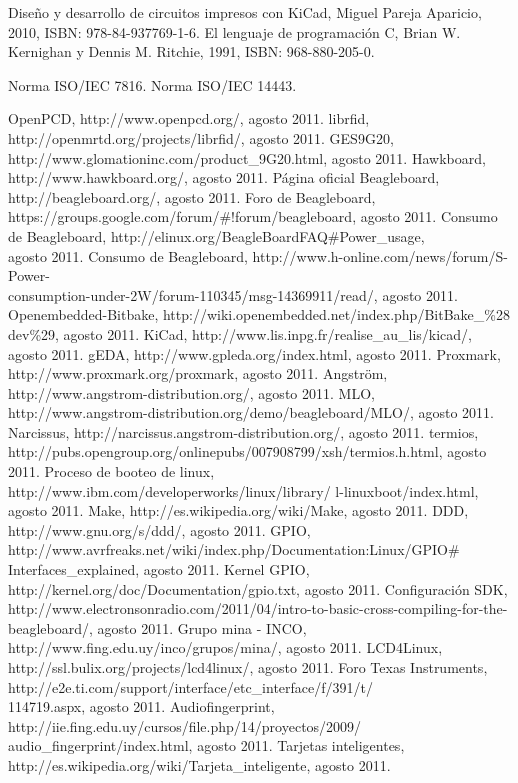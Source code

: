 \begin{thebibliography}{200}
 Diseño y desarrollo de circuitos impresos con KiCad, Miguel Pareja Aparicio, 2010, ISBN: 978-84-937769-1-6.
\bibitem{} El lenguaje de programación C, Brian W. Kernighan y Dennis M. Ritchie, 1991, ISBN: 968-880-205-0.

 Norma ISO/IEC 7816.
 Norma ISO/IEC 14443.


 OpenPCD, http://www.openpcd.org/, agosto 2011.
 librfid, http://openmrtd.org/projects/librfid/, agosto 2011.
 GES9G20, http://www.glomationinc.com/product\_9G20.html, agosto 2011.
 Hawkboard, http://www.hawkboard.org/, agosto 2011.
 Página oficial Beagleboard, http://beagleboard.org/, agosto 2011.
 Foro de Beagleboard, https://groups.google.com/forum/\#!forum/beagleboard, agosto 2011.
 Consumo de Beagleboard, http://elinux.org/BeagleBoardFAQ\#Power\_usage, \\
agosto 2011.
 Consumo de Beagleboard, http://www.h-online.com/news/forum/S-Power-\\
consumption-under-2W/forum-110345/msg-14369911/read/, agosto 2011.
 Openembedded-Bitbake, http://wiki.openembedded.net/index.php/BitBake\_\%28
dev\%29, agosto 2011.
 KiCad, http://www.lis.inpg.fr/realise\_au\_lis/kicad/, agosto 2011.
 gEDA, http://www.gpleda.org/index.html, agosto 2011.
 Proxmark, http://www.proxmark.org/proxmark, agosto 2011.
 Angström, http://www.angstrom-distribution.org/, agosto 2011.
 MLO, http://www.angstrom-distribution.org/demo/beagleboard/MLO/, agosto 2011.
 Narcissus, http://narcissus.angstrom-distribution.org/, agosto 2011.
 termios, http://pubs.opengroup.org/onlinepubs/007908799/xsh/termios.h.html, agosto 2011.
 Proceso de booteo de linux, http://www.ibm.com/developerworks/linux/library/
l-linuxboot/index.html, agosto 2011.
 Make, http://es.wikipedia.org/wiki/Make, agosto 2011.
 DDD, http://www.gnu.org/s/ddd/, agosto 2011.
 GPIO, http://www.avrfreaks.net/wiki/index.php/Documentation:Linux/GPIO\#
Interfaces\_explained, agosto 2011.
 Kernel GPIO, http://kernel.org/doc/Documentation/gpio.txt, agosto 2011.
 Configuración SDK, http://www.electronsonradio.com/2011/04/intro-to-basic-cross-compiling-for-the-beagleboard/, agosto 2011.
 Grupo mina - INCO, http://www.fing.edu.uy/inco/grupos/mina/, agosto 2011.
 LCD4Linux, http://ssl.bulix.org/projects/lcd4linux/, agosto 2011.
 Foro Texas Instruments, http://e2e.ti.com/support/interface/etc\_interface/f/391/t/\\
114719.aspx, agosto 2011.
 Audiofingerprint, http://iie.fing.edu.uy/cursos/file.php/14/proyectos/2009/\\
audio\_fingerprint/index.html, agosto 2011.
 Tarjetas inteligentes, http://es.wikipedia.org/wiki/Tarjeta\_inteligente, agosto 2011.


\end{thebibliography}
